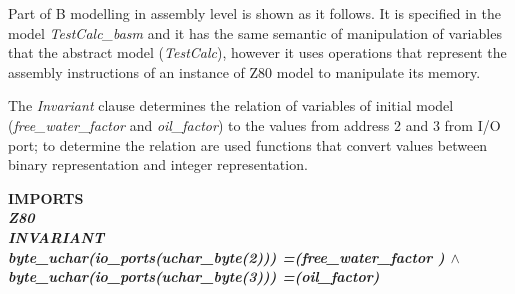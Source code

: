 Part of B modelling in assembly level is shown as it follows. It is specified in
the model \textit{TestCalc\_basm} and it has the same semantic of manipulation of
variables that the abstract model (\textit{TestCalc}), however it uses operations
that represent the assembly instructions of an instance of Z80 model to
manipulate its memory.



The \textit{Invariant} clause  determines the relation of variables of initial model (\textit{free\_water\_factor}
and \textit{oil\_factor}) to the values from address 2 and 3 from I/O port; to determine the relation are used functions
that convert values between binary representation and integer representation.

\small{
\begin{sloppypar}
\hspace*{-0.30in}\bf IMPORTS\\
\hspace*{0.20in}\it Z80\\
\bf INVARIANT\\
\hspace*{0.20in}\it byte\_uchar\rm (\it io\_ports\rm (\it uchar\_byte\rm (\rm 2\rm )\rm )\rm ) \rm
=\hspace*{0.10in}\rm (\it free\_water\_factor \rm )  $\land$\\
\hspace*{0.20in}\it byte\_uchar\rm (\it io\_ports\rm (\it uchar\_byte\rm (\rm 3\rm )\rm )\rm ) \rm
=\hspace*{0.10in}\rm (\it oil\_factor\rm )
\end{sloppypar}
}

